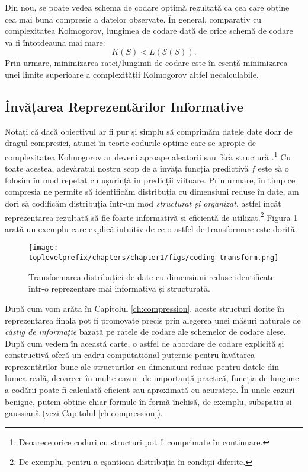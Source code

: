 \documentclass[../../book-main_ro.tex]{subfiles}
\begin{document}
Din nou, se poate vedea schema de codare optimă rezultată ca cea care obține cea mai bună compresie a datelor observate. În general, comparativ cu complexitatea Kolmogorov, lungimea de codare dată de orice schemă de codare va fi întotdeauna mai mare:
\begin{equation}
    K(S) < L( \mathcal E(S)).
\end{equation}
Prin urmare, minimizarea ratei/lungimii de codare este în esență minimizarea unei limite superioare a complexității Kolmogorov altfel necalculabile.

\subsection{Învățarea Reprezentărilor Informative}
Notați că dacă obiectivul ar fi pur și simplu să comprimăm datele date doar de dragul compresiei, atunci în teorie codurile optime care se apropie de complexitatea Kolmogorov ar deveni aproape aleatorii sau fără structură \cite{Chaitin-1966}.\footnote{Deoarece orice coduri cu structuri pot fi comprimate în continuare.} Cu toate acestea, adevăratul nostru scop de a învăța funcția predictivă $f$ este să o folosim în mod repetat cu ușurință în predicții viitoare. Prin urmare, în timp ce compresia ne permite să identificăm distribuția cu dimensiuni reduse în date, am dori să codificăm distribuția într-un mod {\em structurat și organizat}, astfel încât reprezentarea rezultată să fie foarte informativă și eficientă de utilizat.\footnote{De exemplu, pentru a eșantiona distribuția în condiții diferite.} Figura \ref{fig:expansion} arată un exemplu care explică intuitiv de ce o astfel de transformare este dorită.

\begin{figure}
    \centering
    \texttt{[image: \\toplevelprefix/chapters/chapter1/figs/coding-transform.png]}
    \caption{Transformarea distribuției de date cu dimensiuni reduse identificate într-o reprezentare mai informativă și structurată.}
    \label{fig:expansion}
\end{figure}
După cum vom arăta în Capitolul \ref{ch:compression}, aceste structuri dorite în reprezentarea finală pot fi promovate precis prin alegerea unei măsuri naturale de {\em câștig de informație} bazată pe ratele de codare ale schemelor de codare alese. După cum vedem în această carte, o astfel de abordare de codare explicită și constructivă oferă un cadru computațional puternic pentru învățarea reprezentărilor bune ale structurilor cu dimensiuni reduse pentru datele din lumea reală, deoarece în multe cazuri de importanță practică, funcția de lungime a codării poate fi calculată eficient sau aproximată cu acuratețe. În unele cazuri benigne, putem obține chiar formule în formă închisă, de exemplu, subspațiu și gaussiană (vezi Capitolul \ref{ch:compression}).
\end{document}
